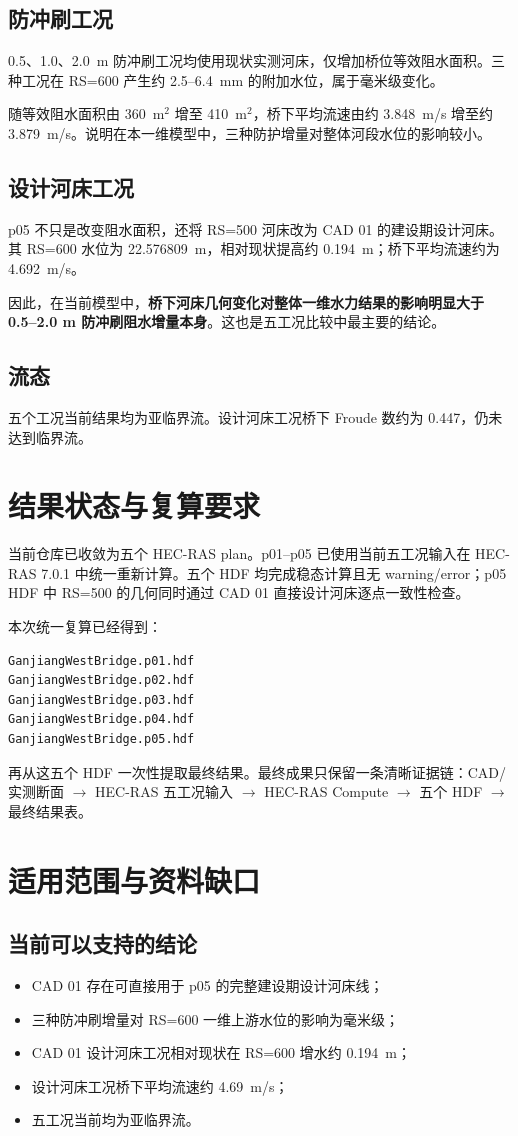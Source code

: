 \documentclass[UTF8,a4paper,12pt]{ctexart}
\begin{document}
\subsection{防冲刷工况}
0.5、1.0、2.0~m 防冲刷工况均使用现状实测河床，仅增加桥位等效阻水面积。三种工况在 RS=600 产生约 2.5--6.4~mm 的附加水位，属于毫米级变化。

随等效阻水面积由 360~m$^2$ 增至 410~m$^2$，桥下平均流速由约 3.848~m/s 增至约 3.879~m/s。说明在本一维模型中，三种防护增量对整体河段水位的影响较小。

\subsection{设计河床工况}
p05 不只是改变阻水面积，还将 RS=500 河床改为 CAD 01 的建设期设计河床。其 RS=600 水位为 22.576809~m，相对现状提高约 0.194~m；桥下平均流速约为 4.692~m/s。

因此，在当前模型中，\textbf{桥下河床几何变化对整体一维水力结果的影响明显大于 0.5--2.0 m 防冲刷阻水增量本身}。这也是五工况比较中最主要的结论。

\subsection{流态}
五个工况当前结果均为亚临界流。设计河床工况桥下 Froude 数约为 0.447，仍未达到临界流。

\section{结果状态与复算要求}
当前仓库已收敛为五个 HEC-RAS plan。p01--p05 已使用当前五工况输入在 HEC-RAS 7.0.1 中统一重新计算。五个 HDF 均完成稳态计算且无 warning/error；p05 HDF 中 RS=500 的几何同时通过 CAD 01 直接设计河床逐点一致性检查。

本次统一复算已经得到：
\begin{verbatim}
GanjiangWestBridge.p01.hdf
GanjiangWestBridge.p02.hdf
GanjiangWestBridge.p03.hdf
GanjiangWestBridge.p04.hdf
GanjiangWestBridge.p05.hdf
\end{verbatim}

再从这五个 HDF 一次性提取最终结果。最终成果只保留一条清晰证据链：CAD/实测断面 $\rightarrow$ HEC-RAS 五工况输入 $\rightarrow$ HEC-RAS Compute $\rightarrow$ 五个 HDF $\rightarrow$ 最终结果表。

\section{适用范围与资料缺口}
\subsection{当前可以支持的结论}
\begin{itemize}[leftmargin=2.2em]
\item CAD 01 存在可直接用于 p05 的完整建设期设计河床线；
\item 三种防冲刷增量对 RS=600 一维上游水位的影响为毫米级；
\item CAD 01 设计河床工况相对现状在 RS=600 增水约 0.194~m；
\item 设计河床工况桥下平均流速约 4.69~m/s；
\item 五工况当前均为亚临界流。
\end{itemize}
\end{document}
